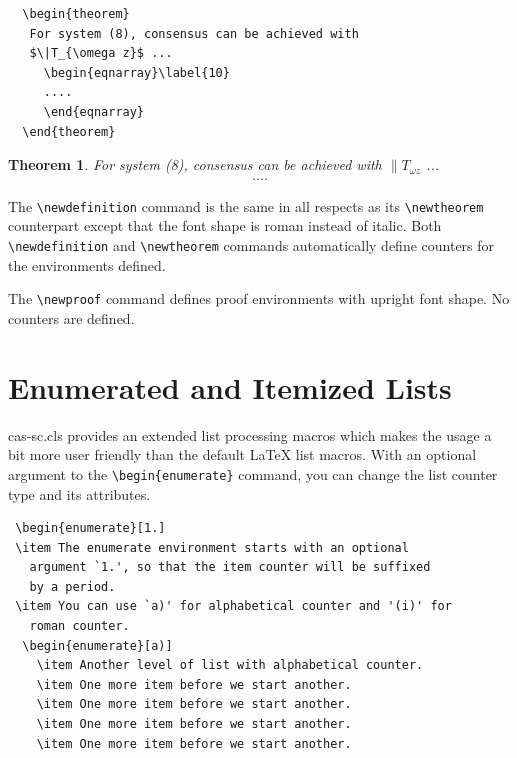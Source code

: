 \documentclass[a4paper,fleqn]{cas-sc}
\begin{document}
\begin{verbatim}
  \begin{theorem} 
   For system (8), consensus can be achieved with 
   $\|T_{\omega z}$ ...
     \begin{eqnarray}\label{10}
     ....
     \end{eqnarray}
  \end{theorem}
\end{verbatim}  

\newtheorem{theorem}{Theorem}

\begin{theorem}
For system (8), consensus can be achieved with 
$\|T_{\omega z}$ ...
\begin{eqnarray}\label{10}
....
\end{eqnarray}
\end{theorem}

The \verb+\newdefinition+ command is the same in
all respects as its \verb+\newtheorem+ counterpart except that
the font shape is roman instead of italic.  Both
\verb+\newdefinition+ and \verb+\newtheorem+ commands
automatically define counters for the environments defined.

The \verb+\newproof+ command defines proof environments with
upright font shape.  No counters are defined. 


\section[Enumerated ...]{Enumerated and Itemized Lists}
{cas-sc.cls} provides an extended list processing macros
which makes the usage a bit more user friendly than the default
\LaTeX{} list macros.   With an optional argument to the
\verb+\begin{enumerate}+ command, you can change the list counter
type and its attributes.

\begin{verbatim}
 \begin{enumerate}[1.]
 \item The enumerate environment starts with an optional
   argument `1.', so that the item counter will be suffixed
   by a period.
 \item You can use `a)' for alphabetical counter and '(i)' for
   roman counter.
  \begin{enumerate}[a)]
    \item Another level of list with alphabetical counter.
    \item One more item before we start another.
    \item One more item before we start another.
    \item One more item before we start another.
    \item One more item before we start another.
\end{verbatim}
\end{document}
